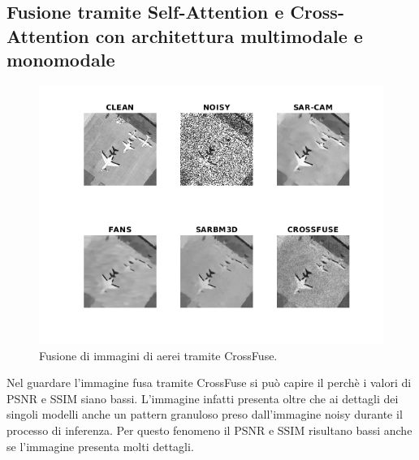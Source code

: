 \subsection{Fusione tramite Self-Attention e Cross-Attention con architettura multimodale e monomodale} 
\begin{figure}[H] 
  \centering
  \includegraphics[width=1.1\textwidth]{utils/CFairplane00.png}
  \caption{Fusione di immagini di aerei tramite CrossFuse.}
  \label{fig:airplane00CF}
\end{figure}
Nel guardare l'immagine fusa tramite CrossFuse si può capire il perchè i valori di PSNR e SSIM siano bassi.
L'immagine infatti presenta oltre che ai dettagli dei singoli modelli anche un pattern granuloso preso dall'immagine noisy 
durante il processo di inferenza. Per questo fenomeno il PSNR e SSIM risultano bassi anche se l'immagine presenta molti dettagli.


